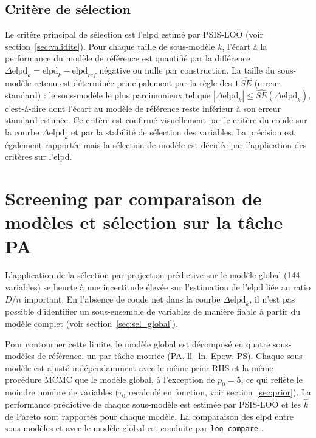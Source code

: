 \subsection{Critère de sélection}\label{sec:critere}

Le critère principal de sélection est l'elpd estimé par PSIS-LOO (voir section~\ref{sec:validite}). Pour chaque taille de sous-modèle $k$, l'écart à la performance du modèle de référence est quantifié par la différence $\Delta \text{elpd}_k=\text{elpd}_k - \text{elpd}_{ref}$ négative ou nulle par construction. La taille du sous-modèle retenu est déterminée principalement par la règle des $1\,\widehat{SE}$ (erreur standard)  \parencite{Piironen2018Oct} : le sous-modèle le plus parcimonieux tel que $|\Delta\text{elpd}_k| \leq \widehat{SE}(\Delta\text{elpd}_k)$, c'est-à-dire dont l'écart au modèle de référence reste inférieur à son erreur standard estimée. Ce critère est confirmé visuellement par le critère du coude sur la courbe $\Delta \text{elpd}_k$ et par la stabilité de sélection des variables. La précision est également rapportée mais la sélection de modèle est décidée par l'application des critères sur l'elpd.


\section{Screening par comparaison de modèles et sélection sur la tâche PA}
L'application de la sélection par projection prédictive sur le modèle global (144 variables) se heurte à une incertitude élevée sur l'estimation de l'elpd liée au ratio $D/n$ important. En l'absence de coude net dans la courbe $\Delta\text{elpd}_k$, il n'est pas possible d'identifier un sous-ensemble de variables de manière fiable à partir du modèle complet (voir section~\ref{sec:sel_global}).

\medskip

Pour contourner cette limite, le modèle global est décomposé en quatre sous-modèles de référence, un par tâche motrice (PA, ll\_ln, Epow, PS). Chaque sous-modèle est ajusté indépendamment avec le même prior RHS et la même procédure MCMC que le modèle global, à l'exception de $p_0 = 5$, ce qui reflète le moindre nombre de variables ($\tau_0$ recalculé en fonction, voir section~\ref{sec:prior}). La performance prédictive de chaque sous-modèle est estimée par PSIS-LOO et les $\hat{k}$ de Pareto sont rapportés pour chaque modèle. La comparaison des elpd entre sous-modèles et avec le modèle global est conduite par \texttt{loo\_compare} \parencite{loo}.


